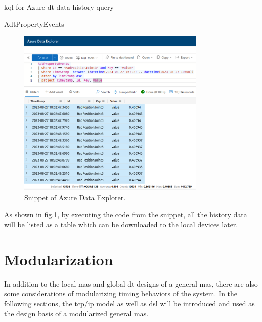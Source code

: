 \begin{algorithm}
    \caption{\gls{kql} for Azure \gls{dt} data history query}
    \label{alg: KQLCode}
    \begin{algorithmic}
        \State  AdtPropertyEvents 
    \end{algorithmic}
\end{algorithm}


\begin{figure}[htb]
    \centering
    \includegraphics[width=0.8\textwidth]{figures/KQL_cut.jpg}
    \caption{Snippet of Azure Data Explorer.\label{fig: KQL}}
\end{figure}

As shown in fig.\ref{fig: KQL}, by executing the code from the snippet, all the history data will be listed as a table 
which can be downloaded to the local devices later. 


\section{Modularization}\label{chap: Meth-Modular}
In addition to the local \gls{mas} and global \gls{dt} designs of a general \gls{mas}, 
there are also some considerations of modularizing timing behaviors of the 
system. In the following sections, the \gls{tcp/ip} model as well as 
\gls{dsl} will be introduced and used as the design basis of a modularized general 
\gls{mas}. 
